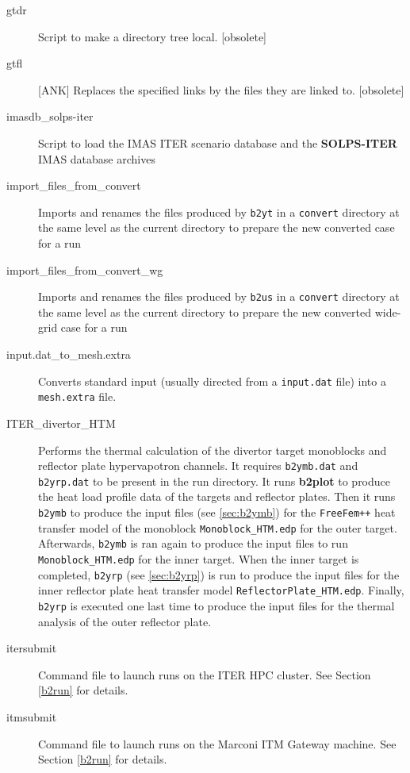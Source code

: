 \documentclass[a4paper,10pt]{report}
\newcommand\SOLPSITER{{\bf SOLPS-ITER} }
\newcommand{\btwoplot}{{\bf b2plot} }
\begin{document}
\begin{itemize}
\begin{description}
  \item[gtdr] Script to make a directory tree local. [obsolete]
  \item[gtfl] [ANK] Replaces the specified links by the files they are linked to. [obsolete]
  \item[imasdb\_solps-iter] Script to load the IMAS ITER scenario database and the \SOLPSITER IMAS database archives
  \item[import\_files\_from\_convert] Imports and renames the files produced by {\tt b2yt} in a {\tt convert} directory at the same level as the current directory to prepare the new converted case for a run
  \item[import\_files\_from\_convert\_wg] Imports and renames the files produced by {\tt b2us} in a {\tt convert} directory at the same level as the current directory to prepare the new converted wide-grid case for a run
  \item[input.dat\_to\_mesh.extra] Converts standard input (usually directed from a {\tt input.dat} file) into a {\tt mesh.extra} file.
  \item[ITER\_divertor\_HTM] Performs the thermal calculation of the divertor target monoblocks and reflector plate hypervapotron channels. It requires {\tt b2ymb.dat} and {\tt b2yrp.dat} to be present in the run directory. It runs \btwoplot to produce the heat load profile data of the targets and reflector plates. Then it runs {\tt b2ymb} to produce the input files (see \ref{sec:b2ymb}) for the {\tt FreeFem++}\cite{MR3043640} heat transfer model of the monoblock {\tt Monoblock\_HTM.edp} for the outer target. Afterwards, {\tt b2ymb} is ran again to produce the input files to run {\tt Monoblock\_HTM.edp} for the inner target. When the inner target is completed, {\tt b2yrp} (see \ref{sec:b2yrp}) is run to produce the input files for the inner reflector plate heat transfer model {\tt ReflectorPlate\_HTM.edp}. Finally, {\tt b2yrp} is executed one last time to produce the input files for the thermal analysis of the outer reflector plate.
  \item[itersubmit] Command file to launch runs on the ITER HPC cluster. See Section \ref{b2run} for details.
  \item[itmsubmit] Command file to launch runs on the Marconi ITM Gateway machine. See Section \ref{b2run} for details.

\end{description}
\end{itemize}
\end{document}
